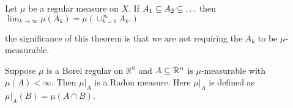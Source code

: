 \begin{thm}
  Let $\mu$ be a regular measure on $X$. If $A_1\subseteq A_2 \subseteq \ldots$
  then $\lim_{k\to \infty}\mu(A_k) = \mu\left( \cup_{k=1}^\infty A_k.
  \right)$
\end{thm}

the significance of this theorem is that we are not requiring the $A_k$
to be $\mu$-measurable.

\begin{thm}
  Suppose $\mu$ is a Borel regular on $\mathbb{R}^n$ and $A\subseteq
  \mathbb{R}^n$ is $\mu$-measurable with $\mu(A)<\infty$. Then
  $\mu\rvert_A$ is a Radon measure. Here $\mu\rvert_A$ is defined as
  $\mu\rvert_A(B)= \mu(A\cap B)$.
\end{thm}

